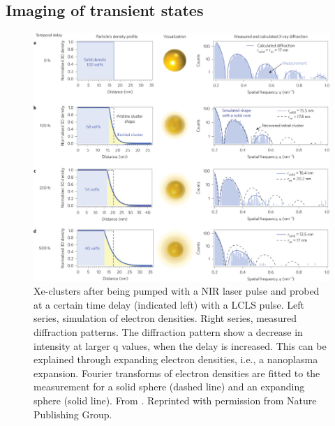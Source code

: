 \subsection{Imaging of transient states}
\begin{figure}
	\centering
		\includegraphics[width=1.00\textwidth]{images/tais-nat-photonics.jpg}
	\caption[Measurement and simulation of the nanoplasma expansion in Xe-clusters.]{Xe-clusters after being pumped with a NIR laser pulse and probed at a certain time delay (indicated left) with a LCLS pulse. Left series, simulation of electron densities. Right series, measured diffraction patterns. The diffraction pattern show a decrease in intensity at larger q values, when the delay is increased. This can be explained through expanding electron densities, i.e., a nanoplasma expansion. Fourier transforms of electron densities are fitted to the measurement for a solid sphere (dashed line) and an expanding sphere (solid line). From \citep{Gorkhover-2016-NatPho}. Reprinted with permission from Nature Publishing Group.}
	\label{fig:tais-nat-photonics}
\end{figure}
